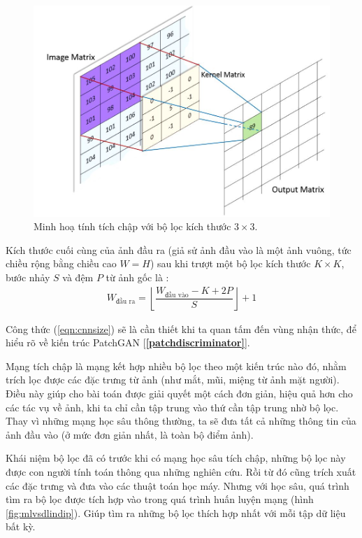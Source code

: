 \documentclass[a4paper, 12pt]{report}
\begin{document}
\begin{figure}[!h]
\captionsetup{width=0.8\textwidth}
\centering
\includegraphics[width=15cm]{images/convinimage.jpg}
\caption{Minh hoạ tính tích chập với bộ lọc kích thước $3 \times 3$.}
\label{fig:convoperator}
\end{figure}

Kích thước cuối cùng của ảnh đầu ra (giả sử ảnh đầu vào là một ảnh vuông, tức chiều rộng bằng chiều cao $W = H$) sau khi trượt một bộ lọc kích thước $K \times K$, bước nhảy $S$ và đệm $P$ từ ảnh gốc là \cite{replycalcnnsize}:
\begin{align}
    W_{\text{đầu ra}} = \left\lfloor\dfrac{W_{\text{đầu vào}} - K + 2P}{S}\right\rfloor + 1\label{eqn:cnnsize}
\end{align}

Công thức (\ref{eqn:cnnsize}) sẽ là cần thiết khi ta quan tấm đến vùng nhận thức, để hiểu rõ về kiến trúc PatchGAN [\textbf{\ref{patchdiscriminator}}].\vspace{5pt}

Mạng tích chập là mạng kết hợp nhiều bộ lọc theo một kiến trúc nào đó, nhằm trích lọc được các đặc trưng từ ảnh (như mắt, mũi, miệng từ ảnh mặt người).
Điều này giúp cho bài toán được giải quyết một cách đơn giản, hiệu quả hơn cho các tác vụ về ảnh, khi ta chỉ cần tập trung vào thứ cần tập trung nhờ bộ lọc.
Thay vì những mạng học sâu thông thường, ta sẽ đưa tất cả những thông tin của ảnh đầu vào (ở mức đơn giản nhất, là toàn bộ điểm ảnh).\vspace{5pt}

Khái niệm bộ lọc đã có trước khi có mạng học sâu tích chập, những bộ lọc này được con người tính toán thông qua những nghiên cứu.
Rồi từ đó cũng trích xuất các đặc trưng và đưa vào các thuật toán học máy.
Nhưng với học sâu, quá trình tìm ra bộ lọc được tích hợp vào trong quá trình huấn luyện mạng (hình \ref{fig:mlvsdlindip}).
Giúp tìm ra những bộ lọc thích hợp nhất với mỗi tập dữ liệu bất kỳ.\vspace{5pt}
\end{document}
